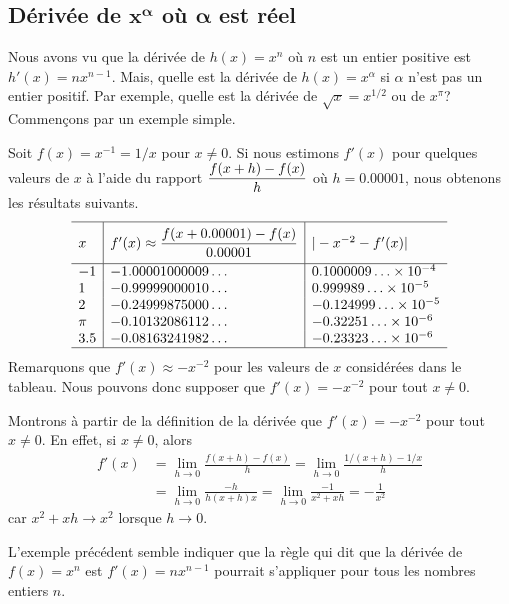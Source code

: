 {\subsection{Dérivée de $\mathbf{x^\alpha}$ où $\mathbf{\alpha}$ est réel}

Nous avons vu que la dérivée de $h(x) = x^n$ où $n$ est un entier positive
est $h'(x) = nx^{n-1}$.  Mais, quelle est la dérivée de
$h(x) = x^{\alpha}$ si $\alpha$ n'est pas un entier positif.  Par
exemple, quelle est la dérivée de $\sqrt{x} = x^{1/2}$ ou de $x^\pi$?
Commençons par un exemple simple.

\begin{egg}
Soit $f(x)= x^{-1} = 1/x$ pour $x\neq 0$.  Si nous estimons $f'(x)$ pour
quelques valeurs de $x$ à l'aide du rapport
$\displaystyle \frac{f(x+h)-f(x)}{h}$ où
$h = 0.00001$, nous obtenons les résultats suivants.
\[
\begin{array}{l|l|l}
\hline
\rule[-0.7em]{0ex}{2.5em} x &
f'(x) \approx \DS \frac{f(x+0.00001)-f(x)}{0.00001}
 & |-x^{-2} - f'(x) | \\[0.8em]
\hline
-1 & -1.00001000009\ldots & 0.1000009\ldots \times 10^{-4} \\
 1 & -0.99999000010\ldots & 0.999989\ldots \times 10^{-5} \\
 2 & -0.24999875000\ldots & -0.124999\ldots \times 10^{-5} \\
\pi & -0.10132086112\ldots & -0.32251\ldots \times 10^{-6} \\
3.5 & -0.08163241982\ldots & -0.23323\ldots \times 10^{-6} \\
\hline
\end{array}
\]
Remarquons que $f'(x) \approx -x^{-2}$ pour les valeurs de $x$
considérées dans le tableau.  Nous pouvons donc supposer que
$f'(x) = -x^{-2}$ pour tout $x\neq 0$.

Montrons à partir de la définition de la dérivée que
$f'(x) = -x^{-2}$ pour tout $x\neq 0$.  En effet, si $x\neq 0$, alors
\begin{align*}
f'(x) &= \lim_{h\to 0} \frac{f(x+h)-f(x)}{h}
= \lim_{h\to 0} \frac{1/(x+h) - 1/x}{h} \\
&= \lim_{h\to 0} \frac{-h}{h(x+h)x}
= \lim_{h\to 0} \frac{-1}{x^2 + x h} = -\frac{1}{x^2}
\end{align*}
car $x^2 + x h \to x^2$ lorsque $h \to 0$.
\label{XminusONE}
\end{egg}

L'exemple précédent semble indiquer que la règle qui dit que la
dérivée de $f(x) = x^n$ est $f'(x) = nx^{n-1}$ pourrait s'appliquer
pour tous les nombres entiers $n$.

}
